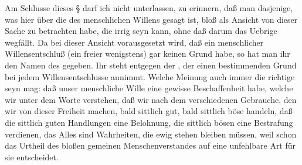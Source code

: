 \begin{RWanm}
Am Schlusse dieses § darf ich nicht unterlassen, zu erinnern, daß man dasjenige, was hier über die  des menschlichen Willens gesagt ist, bloß als  Ansicht von dieser Sache zu betrachten habe, die irrig seyn kann, ohne daß darum das Uebrige wegfällt. Da bei dieser Ansicht vorausgesetzt wird, daß ein menschlicher Willensentschluß (ein freier wenigstens) gar keinen  Grund habe, so hat man ihr den Namen des  gegeben. Ihr steht entgegen der , der einen bestimmenden Grund bei jedem Willensentschlusse annimmt. Welche Meinung auch immer die richtige seyn mag: daß unser menschliche Wille eine gewisse Beschaffenheit habe, welche wir unter dem Worte  verstehen, daß wir nach dem verschiedenen Gebrauche, den wir von dieser Freiheit machen, bald sittlich gut, bald sittlich böse handeln, daß die sittlich guten Handlungen eine Belohnung, die sittlich bösen eine Bestrafung verdienen, das Alles sind Wahrheiten, die ewig stehen bleiben müssen, weil schon das Urtheil des bloßen gemeinen Menschenverstandes auf eine unfehlbare Art für sie entscheidet.~
\end{RWanm}

